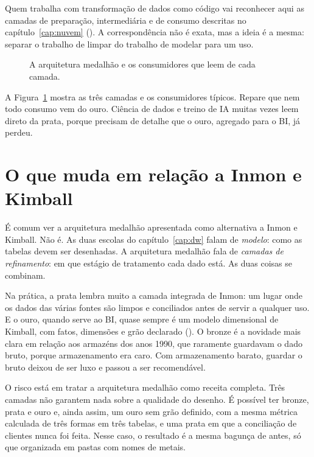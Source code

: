 Quem trabalha com transformação de dados como código vai reconhecer aqui as camadas de
preparação, intermediária e de consumo descritas no capítulo~\ref{cap:nuvem}
(). A correspondência não é exata, mas a ideia é a mesma: separar o trabalho
de limpar do trabalho de modelar para um uso.

\begin{figure}[htbp]
  \centering
  
  \caption{A arquitetura medalhão e os consumidores que leem de cada camada.}
  \label{fig:medalhao}
\end{figure}

A Figura~\ref{fig:medalhao} mostra as três camadas e os consumidores típicos. Repare que
nem todo consumo vem do ouro. Ciência de dados e treino de IA muitas vezes leem direto da
prata, porque precisam de detalhe que o ouro, agregado para o BI, já perdeu.

\section{O que muda em relação a Inmon e Kimball}
\label{sec:medalhao-tradicional}

É comum ver a arquitetura medalhão apresentada como alternativa a Inmon e Kimball. Não é.
As duas escolas do capítulo~\ref{cap:dw} falam de \emph{modelo}: como as tabelas devem ser
desenhadas. A arquitetura medalhão fala de \emph{camadas de refinamento}: em que estágio de
tratamento cada dado está. As duas coisas se combinam.

Na prática, a prata lembra muito a camada integrada de Inmon: um lugar onde os dados das
várias fontes são limpos e conciliados antes de servir a qualquer uso. E o ouro, quando
serve ao BI, quase sempre é um modelo dimensional de Kimball, com fatos, dimensões e grão
declarado (). O bronze é a novidade mais clara em relação
aos armazéns dos anos 1990, que raramente guardavam o dado bruto, porque armazenamento era
caro. Com armazenamento barato, guardar o bruto deixou de ser luxo e passou a ser
recomendável.

O risco está em tratar a arquitetura medalhão como receita completa. Três camadas não
garantem nada sobre a qualidade do desenho. É possível ter bronze, prata e ouro e, ainda
assim, um ouro sem grão definido, com a mesma métrica calculada de três formas em três
tabelas, e uma prata em que a conciliação de clientes nunca foi feita. Nesse caso, o
resultado é a mesma bagunça de antes, só que organizada em pastas com nomes de metais.

